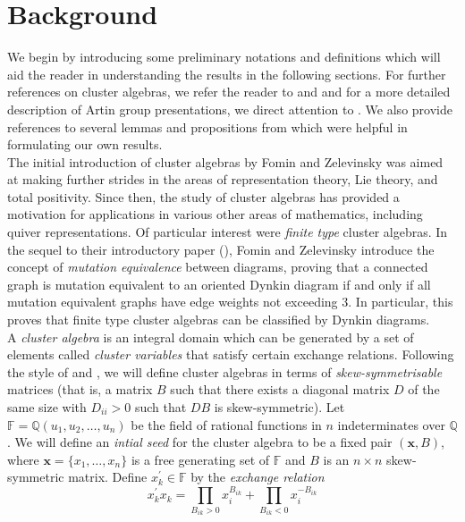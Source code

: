 \documentclass[11pt]{amsart}
\theoremstyle{definition}
\begin{document}
\section{Background}
\label{sec:main_definitions}

We begin by introducing some preliminary notations and definitions which will aid the reader in understanding the results in the following sections. For further references on cluster algebras, we refer the reader to \cite{FZ02} and \cite{FZ03} and for a more detailed description of Artin group presentations, we direct attention to \cite{FN61}. We also provide references to several lemmas and propositions from \cite{BM13} which were helpful in formulating our own results. \\

The initial introduction of cluster algebras by Fomin and Zelevinsky was aimed at making further strides in the areas of representation theory, Lie theory, and total positivity. Since then, the study of cluster algebras has provided a motivation for applications in various other areas of mathematics, including quiver representations. Of particular interest were \textit{finite type} cluster algebras. In the sequel to their introductory paper (\cite{FZ03}), Fomin and Zelevinsky introduce the concept of \textit{mutation equivalence} between diagrams, proving that a connected graph is mutation equivalent to an oriented Dynkin diagram if and only if all mutation equivalent graphs have edge weights not exceeding 3. In particular, this proves that finite type cluster algebras can be classified by Dynkin diagrams. \\
A \textit{cluster algebra} is an integral domain which can be generated by a set of elements called \textit{cluster variables} that satisfy certain exchange relations. Following the style of \cite{FZ02} and \cite{BM13}, we will define cluster algebras in terms of \textit{skew-symmetrisable} matrices (that is, a matrix $B$ such that there exists a diagonal matrix $D$ of the same size with $D_{ii} >0$ such that $DB$ is skew-symmetric). Let $\mathbb{F} = \mathbb{Q}(u_1, u_2, \ldots, u_n)$ be the field of rational functions in $n$ indeterminates over $\mathbb{Q}$. We will define an \textit{intial seed} for the cluster algebra to be a fixed pair $(\textbf{x}, B)$, where $\textbf{x} = \{x_1, \ldots, x_n\}$ is a free generating set of $\mathbb{F}$ and $B$ is an $n \times n$ skew-symmetric matrix. Define $x_k^{\prime} \in \mathbb{F}$ by the \textit{exchange relation}
\begin{displaymath}
x_k^{\prime}x_k = \prod_{B_{ik} > 0}{x_i^{B_{ik}}} + \prod_{B_{ik} < 0}{x_i^{-B_{ik}}}
\end{displaymath}
\end{document}
